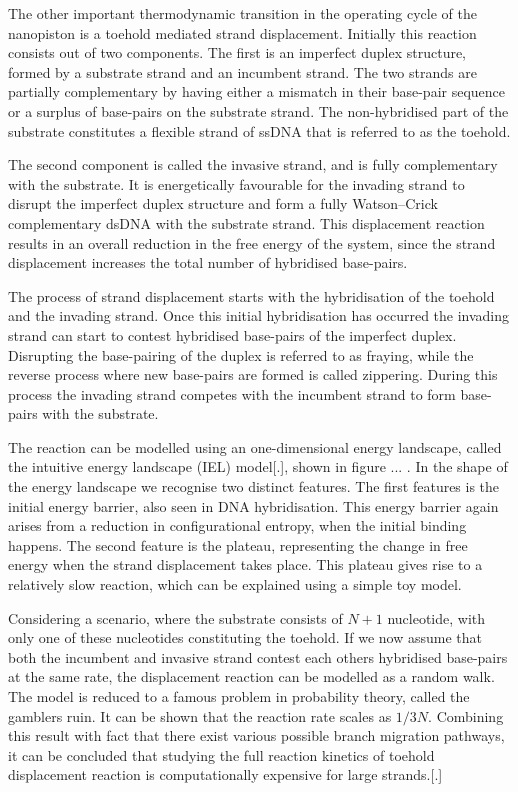 The other important thermodynamic transition in the operating cycle of the nanopiston
is a toehold mediated strand displacement. Initially this reaction consists out of two
components. The first is an imperfect duplex structure, formed by a substrate strand and
an incumbent strand. The two strands are partially complementary by having either a
mismatch in their base-pair sequence or a surplus of base-pairs on the substrate strand.
The non-hybridised part of the substrate constitutes a flexible strand of ssDNA
that is referred to as the toehold.

The second component is called the invasive strand, and is fully complementary with the
substrate. It is energetically favourable for the invading
strand to disrupt the imperfect duplex structure and form a fully Watson–Crick
complementary dsDNA with the substrate strand. This displacement reaction results in an
overall reduction in the free energy of the system, since the strand displacement
increases the total number of hybridised base-pairs.

The process of strand displacement starts with the hybridisation of the toehold and the
invading strand. Once this initial hybridisation has occurred the invading strand can
start to contest hybridised base-pairs of the imperfect duplex. Disrupting the
base-pairing of the duplex is referred to as fraying, while the reverse process
where new base-pairs are formed is called zippering. During this process the invading
strand competes with the incumbent strand to form base-pairs with the substrate.

The reaction can be modelled using an one-dimensional energy landscape, called the
intuitive energy landscape (IEL) model[.], shown in figure ... . In the shape of the
energy landscape we recognise two distinct features. The first features is the initial
energy barrier, also seen in DNA hybridisation. This energy barrier again arises from a
reduction in configurational entropy, when the initial binding happens. The second
feature is the plateau, representing the change in free energy when the strand
displacement takes place. This plateau gives rise to a relatively slow reaction, which
can be explained using a simple toy model.

Considering a scenario, where the substrate consists of $N+1$ nucleotide, with only one
of these nucleotides constituting the toehold. If we now assume that both the incumbent
and invasive strand contest each others hybridised base-pairs at the same rate, the
displacement reaction can be modelled as a random walk. The model is reduced to a famous
problem in probability theory, called the gamblers ruin. It can be shown that the
reaction rate scales as $1/3N$. Combining this result with fact that there exist various
possible branch migration pathways, it can be concluded that studying the full reaction
kinetics of toehold displacement reaction is computationally expensive for large
strands.[.]

